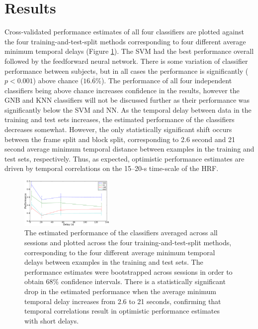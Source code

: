 \documentclass[5p,authoryear]{elsarticle}
\begin{document}
\section{Results}
Cross-validated performance estimates of all four classifiers are plotted against the four training-and-test-split methods corresponding to four different average minimum temporal delays (Figure \ref{fig:performance-verse-temporal-distance}).
The SVM had the best performance overall followed by the feedforward neural network.
There is some variation of classifier performance between subjects, but in all cases the performance is significantly ($p < 0.001$) above chance ($16.\overline{6}$\%). 
The performance of all four independent classifiers being above chance increases confidence in the results, however the GNB and KNN classifiers will not be discussed further as their performance was significantly below the SVM and NN.
As the temporal delay between data in the training and test sets increases, the estimated performance of the classifiers decreases somewhat.
However, the only statistically significant shift occurs between the frame split and block split, corresponding to 2.6 second and 21 second average minimum temporal distance between examples in the training and test sets, respectively.
Thus, as expected, optimistic performance estimates are driven by temporal correlations on the 15--20-s time-scale of the HRF.

\begin{figure}
\centering
\includegraphics[width=0.4\textwidth]{figures/performance-verse-temporal-distance}
\caption{The estimated performance of the classifiers averaged across all sessions and plotted across the four training-and-test-split methods, corresponding to the four different average minimum temporal delays between examples in the training and test sets. 
The performance estimates were bootstrapped across sessions in order to obtain 68\% confidence intervals.
There is a statistically significant drop in the estimated performance when the average minimum temporal delay increases from 2.6 to 21 seconds, confirming that temporal correlations result in optimistic performance estimates with short delays.}
\label{fig:performance-verse-temporal-distance}
\end{figure}
\end{document}
